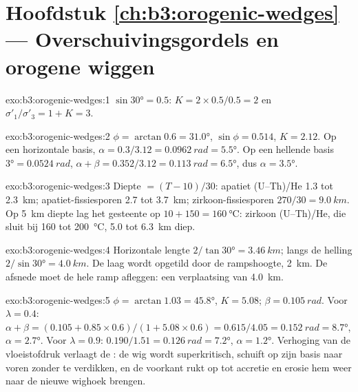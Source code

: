 \section*{Hoofdstuk \ref{ch:b3:orogenic-wedges} --- Overschuivingsgordels en orogene wiggen}

\begin{solution}{exo:b3:orogenic-wedges:1}
$\sin\ang{30} = 0.5$: $K = 2\times0.5/0.5 = 2$ en $\sigma'_1/\sigma'_3 = 1 +
K = 3$.
\end{solution}

\begin{solution}{exo:b3:orogenic-wedges:2}
$\phi = \arctan0.6 = \ang{31.0}$, $\sin\phi = 0.514$, $K = 2.12$. Op een
horizontale basis, $\alpha = 0.3/3.12 = \qty{0.0962}{rad} = \ang{5.5}$. Op een
hellende basis $\ang{3} = \qty{0.0524}{rad}$, $\alpha + \beta = 0.352/3.12 =
\qty{0.113}{rad} = \ang{6.5}$, dus $\alpha = \ang{3.5}$.
\end{solution}

\begin{solution}{exo:b3:orogenic-wedges:3}
Diepte $= (T - 10)/30$: apatiet (U--Th)/He 1.3 tot \qty{2.3}{km};
apatiet-fissiesporen 2.7 tot \qty{3.7}{km}; zirkoon-fissiesporen $270/30 = \qty{9.0}{km}$. Op
\qty{5}{km} diepte lag het gesteente op $10 + 150 = \qty{160}{\celsius}$: zirkoon
(U--Th)/He, die sluit bij 160 tot \qty{200}{\celsius}, 5.0 tot
\qty{6.3}{km} diep.
\end{solution}

\begin{solution}{exo:b3:orogenic-wedges:4}
Horizontale lengte $2/\tan\ang{30} = \qty{3.46}{km}$; langs de helling
$2/\sin\ang{30} = \qty{4.0}{km}$. De laag wordt opgetild door de rampshoogte,
\qty{2}{km}. De afsnede moet de hele ramp afleggen: een verplaatsing van
\qty{4.0}{km}.
\end{solution}

\begin{solution}{exo:b3:orogenic-wedges:5}
$\phi = \arctan1.03 = \ang{45.8}$, $K = 5.08$; $\beta = \qty{0.105}{rad}$.
Voor $\lambda = 0.4$: $\alpha + \beta = (0.105 + 0.85\times0.6)/(1 +
5.08\times0.6) = 0.615/4.05 = \qty{0.152}{rad} = \ang{8.7}$, $\alpha =
\ang{2.7}$. Voor $\lambda = 0.9$: $0.190/1.51 = \qty{0.126}{rad} = \ang{7.2}$,
$\alpha = \ang{1.2}$. Verhoging van de vloeistofdruk verlaagt de :
de wig wordt superkritisch, schuift op zijn basis naar voren zonder
te verdikken, en de voorkant rukt op tot accretie en erosie hem
weer naar de nieuwe wighoek brengen.
\end{solution}

